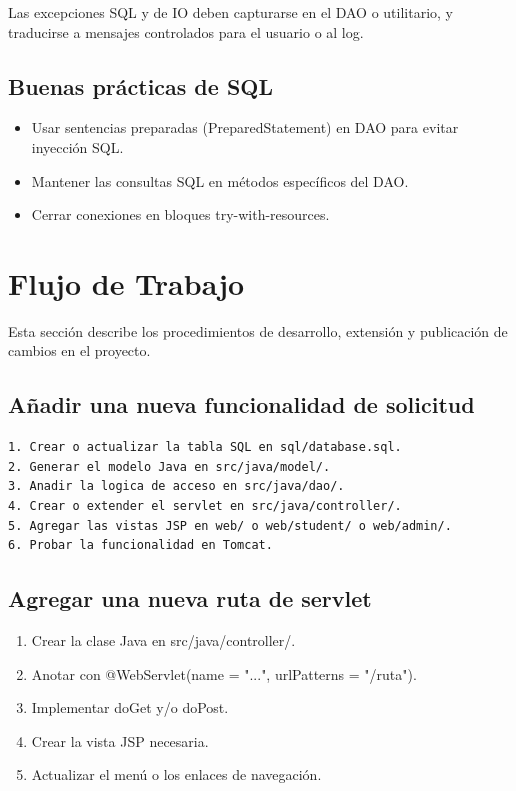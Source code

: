 \documentclass[12pt,letterpaper]{article}
\newcommand{\code}[1]{\texorpdfstring{\begingroup\normalfont\normalsize\def\_{\textunderscore\allowbreak}#1\endgroup}{#1}}
\begin{document}
Las excepciones SQL y de IO deben capturarse en el DAO o utilitario, y traducirse a mensajes controlados para el usuario o al log.

\subsection{Buenas prácticas de SQL}

\begin{itemize}
    \item Usar sentencias preparadas (\code{PreparedStatement}) en DAO para evitar inyección SQL.
    \item Mantener las consultas SQL en métodos específicos del DAO.
    \item Cerrar conexiones en bloques \code{try-with-resources}.
\end{itemize}

\section{Flujo de Trabajo}

Esta sección describe los procedimientos de desarrollo, extensión y publicación de cambios en el proyecto.

\subsection{Añadir una nueva funcionalidad de solicitud}

\begin{lstlisting}[language={}]
1. Crear o actualizar la tabla SQL en sql/database.sql.
2. Generar el modelo Java en src/java/model/.
3. Anadir la logica de acceso en src/java/dao/.
4. Crear o extender el servlet en src/java/controller/.
5. Agregar las vistas JSP en web/ o web/student/ o web/admin/.
6. Probar la funcionalidad en Tomcat.
\end{lstlisting}

\subsection{Agregar una nueva ruta de servlet}

\begin{enumerate}
    \item Crear la clase Java en \code{src/java/controller/}.
    \item Anotar con \code{@WebServlet(name = "...", urlPatterns = {"/ruta"})}.
    \item Implementar \code{doGet} y/o \code{doPost}.
    \item Crear la vista JSP necesaria.
    \item Actualizar el menú o los enlaces de navegación.
\end{enumerate}
\end{document}
